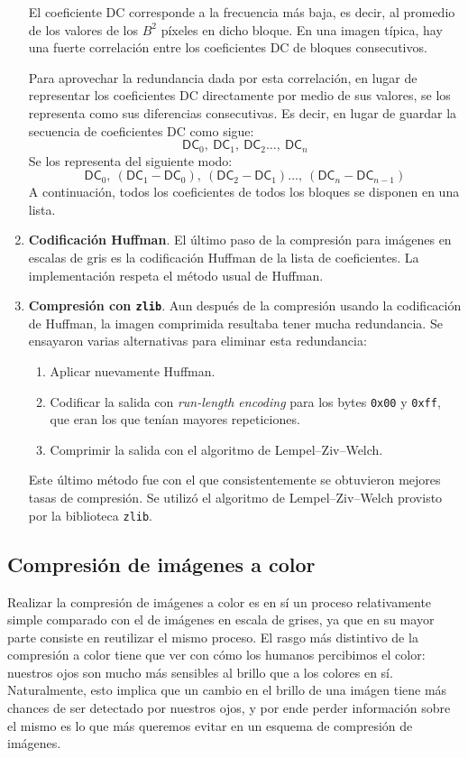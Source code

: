 \documentclass{article}
\begin{document}
\begin{enumerate}
  El coeficiente DC corresponde a la frecuencia más baja, es
  decir, al promedio de los valores de los $B^2$ píxeles en
  dicho bloque.
  En una imagen típica, hay una fuerte correlación entre los
  coeficientes DC de bloques consecutivos.

  Para aprovechar la redundancia dada por esta correlación,
  en lugar de representar los coeficientes DC directamente por
  medio de sus valores,
  se los representa como sus diferencias consecutivas.
  Es decir, en lugar de guardar la secuencia de coeficientes
  DC como sigue:
  \[
    \mathsf{DC}_0,\ \mathsf{DC}_1,\ \mathsf{DC}_2 \hdots,\ \mathsf{DC}_n
  \]
  Se los representa del siguiente modo:
  \[
    \mathsf{DC}_0,\ (\mathsf{DC}_1 - \mathsf{DC}_0),\ (\mathsf{DC}_2 - \mathsf{DC}_1) \hdots,\ (\mathsf{DC}_n - \mathsf{DC}_{n-1})
  \]
  A continuación, todos los coeficientes de todos los bloques
  se disponen en una lista.
\item
  {\bf Codificación Huffman}.
  El último paso de la compresión para imágenes en escalas de
  gris es la codificación Huffman de la lista de coeficientes.
  La implementación respeta el método usual de Huffman.
\item
  {\bf Compresión con \texttt{zlib}}.
  Aun después de la compresión usando la codificación de Huffman,
  la imagen comprimida resultaba tener mucha redundancia.
  Se ensayaron varias alternativas para eliminar esta redundancia:
  \begin{enumerate}
  \item Aplicar nuevamente Huffman.
  \item Codificar la salida con {\em run-length encoding} para los bytes \texttt{0x00} y \texttt{0xff},
        que eran los que tenían mayores repeticiones.
  \item Comprimir la salida con el algoritmo de Lempel--Ziv--Welch.
  \end{enumerate}
  Este último método fue con el que consistentemente se obtuvieron mejores tasas de compresión.
  Se utilizó el algoritmo de Lempel--Ziv--Welch provisto por la biblioteca \texttt{zlib}.
\end{enumerate}

\subsection{Compresión de imágenes a color}

Realizar la compresión de imágenes a color es en sí un proceso relativamente simple comparado con el de imágenes en escala de grises, ya que en su mayor parte consiste en reutilizar el mismo proceso. El rasgo más distintivo de la compresión a color tiene que ver con cómo los humanos percibimos el color: nuestros ojos son mucho más sensibles al brillo que a los colores en sí. Naturalmente, esto implica que un cambio en el brillo de una imágen tiene más chances de ser detectado por nuestros ojos, y por ende perder información sobre el mismo es lo que más queremos evitar en un esquema de compresión de imágenes.
\end{document}
